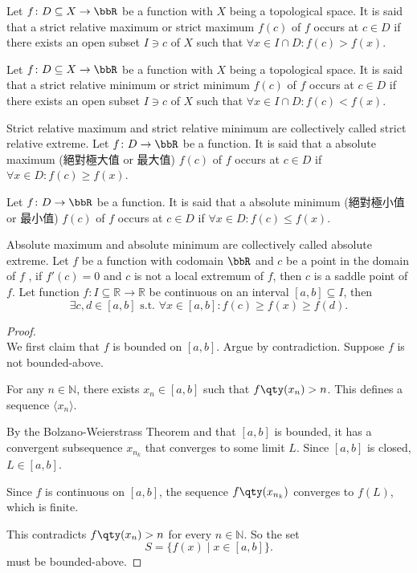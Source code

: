 \documentclass[a4paper,12pt]{report}
\begin{document}
\begin{itemize}
\begin{itemize}
Let $f\colon D\subseteq X\to\bbR$ be a function with $X$ being a topological space. It is said that a strict relative maximum or strict maximum \( f(c) \) of \(f\) occurs at $c\in D$ if there exists an open subset $I\ni c$ of $X$ such that \( \forall x\in I\cap D\colon f(c) > f(x) \).

Let $f\colon D\subseteq X\to\bbR$ be a function with $X$ being a topological space. It is said that a strict relative minimum or strict minimum \( f(c) \) of \(f\) occurs at $c\in D$ if there exists an open subset $I\ni c$ of $X$ such that \( \forall x\in I\cap D\colon f(c) < f(x) \).

Strict relative maximum and strict relative minimum are collectively called strict relative extreme.
Let $f\colon D\to\bbR$ be a function. It is said that a absolute maximum (絕對極大值 or 最大值) \( f(c) \) of \(f\) occurs at $c\in D$ if \( \forall x\in D\colon f(c) \geq f(x) \).

Let $f\colon D\to\bbR$ be a function. It is said that a absolute minimum (絕對極小值 or 最小值) \( f(c) \) of \(f\) occurs at $c\in D$ if \( \forall x\in D\colon f(c) \leq f(x) \).

Absolute maximum and absolute minimum are collectively called absolute extreme.
Let $f$ be a function with codomain $\bbR$ and \( c \) be a point in the domain of $f$ , if \( f'(c) = 0 \) and $c$ is not a local extremum of $f$, then $c$ is a saddle point of $f$.
Let function $f\colon I\subseteq\mathbb{R}\to\mathbb{R}$ be continuous on an interval $[a,b]\subseteq I$, then
\[\exists c,d \in [a, b] \text{\ s.t.\ }\forall x \in [a, b]\colon f(c)\geq f(x)\geq f(d).\]
\begin{proof}\mbox{}\\
We first claim that $f$ is bounded on $[a,b]$. Argue by contradiction. Suppose $f$ is not bounded-above.

For any $n\in\mathbb{N}$, there exists $x_n\in [a,b]$ such that $f\qty(x_n)>n$. This defines a sequence $\langle x_n\rangle$.

By the Bolzano-Weierstrass Theorem and that $[a,b]$ is bounded, it has a convergent subsequence $x_{n_k}$ that converges to some limit $L$. Since $[a,b]$ is closed, $L\in [a,b]$.

Since $f$ is continuous on $[a,b]$, the sequence $f\qty(x_{n_k})$ converges to $f(L)$, which is finite.

This contradicts $f\qty(x_n)>n$ for every $n\in\mathbb{N}$. So the set
\[S=\{f(x)\mid x\in [a,b]\}.\]
must be bounded-above.


\end{proof}
\end{itemize}
\end{itemize}
\end{document}
